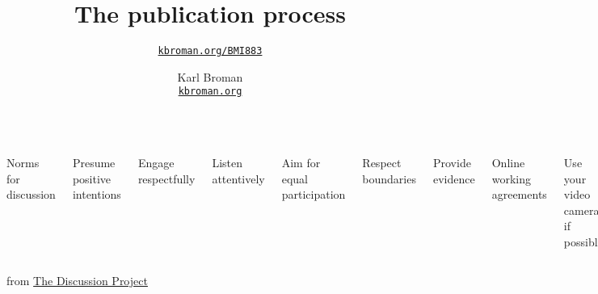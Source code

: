 \documentclass[aspectratio=169,12pt,t]{beamer}
\title{The publication process}
\subtitle{}
\author{\href{https://kbroman.org/BMI883}{\tt kbroman.org/BMI883} }
\institute{}
\date{\small \hspace{3in} Karl Broman \\
  \hspace{3in} \href{https://kbroman.org}{\color{foreground}
    \small \tt kbroman.org}}
\begin{document}
{
\frame{
  \titlepage
} }




\begin{frame}{}

  \begin{columns}

      \centerline{\color{title} Norms for discussion}

      \bigskip

      {\footnotesize
      \bi
    \item Presume positive intentions
    \item Engage respectfully
    \item Listen attentively
    \item Aim for equal participation
    \item Respect boundaries
    \item Provide evidence
      \ei }



      \centerline{\color{title} Online working agreements}

      \bigskip

      \footnotesize

      \bi
    \item Use your video camera if possible
    \item Use names to address each other
    \item Use features (mute, raise hand, chat, etc) appropriately
    \item Be okay with silence
    \item Start and end on time
      \ei

  \end{columns}

\bigskip \bigskip \bigskip
\bigskip \bigskip \bigskip

\hfill {\scriptsize from \href{https://discussion.education.wisc.edu}{The Discussion Project}}

\end{frame}
\end{document}
